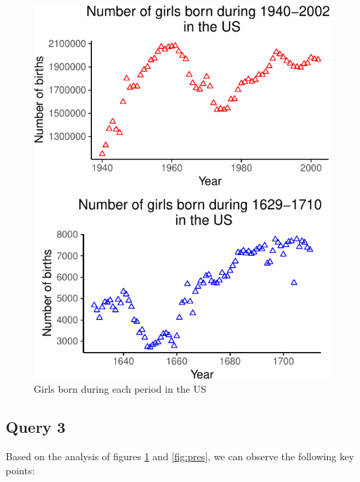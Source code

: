 \documentclass[11pt,a4paper,]{article}
\begin{document}
\begin{figure}

{\centering \includegraphics{Arindom_Baruah_32779267_files/figure-latex/girlbirth-1} 

}

\caption{Girls born during each period in the US}\label{fig:girlbirth}
\end{figure}
\normalsize

\newpage

\hypertarget{query-3}{%
\subsection{Query 3}\label{query-3}}

Based on the analysis of figures \ref{fig:girlbirth} and \ref{fig:pres}, we can observe the following key points:
\end{document}
